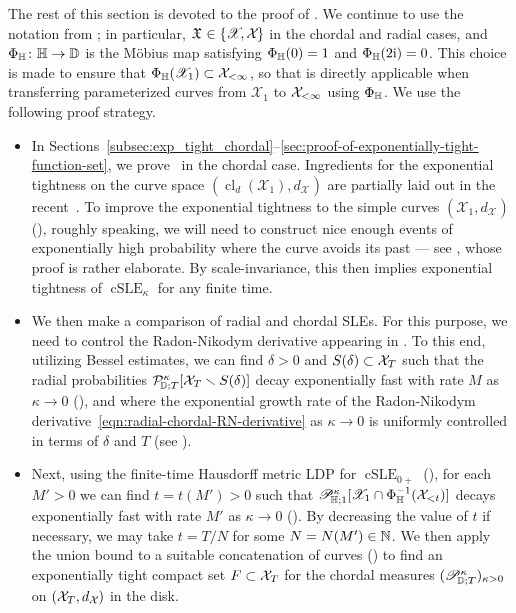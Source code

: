 \documentclass[a4paper, 11pt]{article}
\theoremstyle{definition}
\numberwithin{equation}{section}
\numberwithin{figure}{section}
\newcommand{\cSLE}[1][]{\operatorname{cSLE}_{#1}}
\newcommand{\Dpaths}[1][]{\cX_{#1}}
\newcommand{\Hpaths}[1][]{\mathscr{X}_{#1}} %
\newcommand{\Xpaths}[1][]{\mathfrak{X}_{#1}}
\newcommand{\Hpathscl}[1][]{\operatorname{cl}_{d}(\Hpaths[#1])}
\newcommand{\dDpaths}[1][]{d_{\Dpaths[#1]}}
\newcommand{\dHpaths}[1][]{d_{\!\Hpaths[#1]}}
\newcommand{\rDmeasure}[2][]{\mathcal{P}^{#2}_{\!\bD;#1}}
\newcommand{\cHmeasure}[2][]{\mathscr{P}^{#2}_{\!\bH;#1}}
\newcommand{\cDmeasure}[2][]{\mathscr{P}^{#2}_{\!\bD;#1}}
\begin{document}
The rest of this section is devoted to the proof of . 
We continue to use the notation from ;
in particular, $\Xpaths \in \{\Hpaths,\Dpaths\}$ in the chordal and radial cases, and 
$\Phi_{\mathbb{H}} \colon \mathbb{H} \to \mathbb{D}$ is
the M\"obius map satisfying $\Phi_{\mathbb{H}}(0) = 1$ and $\Phi_{\mathbb{H}}(2\mathrm{i}) = 0$. 
This choice is made to ensure that $\Phi_\bH(\Hpaths[1]) \subset \Dpaths[<\infty]$, so that  is directly applicable when transferring parameterized curves from $\Hpaths[1]$ to $\Dpaths[<\infty]$ using $\Phi_{\mathbb{H}}$.
We use the following proof strategy.

\begin{itemize}[leftmargin=*]
\item 
In Sections~\ref{subsec:exp_tight_chordal}--\ref{sec:proof-of-exponentially-tight-function-set}, 
we prove~ in the chordal case. 
Ingredients for the exponential tightness on the curve space $(\Hpathscl[1], \dHpaths)$ are partially laid out in the recent~\cite{Guskov:LPD_for_SLE_in_the_uniform_topology}. 
To improve the exponential tightness to the simple curves $(\Hpaths[1], \dHpaths)$ (), 
roughly speaking, we will need to construct nice enough events of exponentially high probability
where the curve avoids its past --- see , whose proof is rather elaborate.
By scale-invariance, this then implies exponential tightness of $\cSLE[\kappa]$ for any finite time.
 
\item 
We then make a comparison of radial and chordal SLEs. 
For this purpose, we need to control the Radon-Nikodym derivative appearing in . 
To this end, utilizing Bessel estimates, we can find $\delta > 0$ 
and $S(\delta) \subset \Dpaths[T]$ 
such that the radial probabilities 
$\rDmeasure[T]{\kappa}[\Dpaths[T] \smallsetminus S(\delta)]$ 
decay exponentially fast with rate $M$ as $\kappa \to 0$ 
(), 
and where the exponential growth rate of the Radon-Nikodym derivative~\eqref{eqn:radial-chordal-RN-derivative} as $\kappa \to 0$ 
is uniformly controlled in terms of $\delta$ and $T$
(see ). 

\item 
Next, using the finite-time Hausdorff metric LDP for $\cSLE[0+]$ (),  
for each $M' > 0$ we can find $t = t(M') > 0$ such that $\cHmeasure[1]{\kappa}[\Hpaths[1] \cap \Phi_\bH^{-1}(\Dpaths[< t])]$ decays exponentially fast with rate $M'$ as $\kappa \to 0$ (). 
By decreasing the value of $t$ if necessary, we may take $t = T/N$ for some $N = N(M') \in \mathbb{N}$.
We then apply the union bound to a suitable concatenation of curves () 
to find an exponentially tight compact set $\compact \subset \Dpaths[T]$ 
for the chordal measures $(\cDmeasure[T]{\kappa})_{\kappa > 0}$ on $(\Dpaths[T],\dDpaths)$ in the disk. 


\end{itemize}
\end{document}
